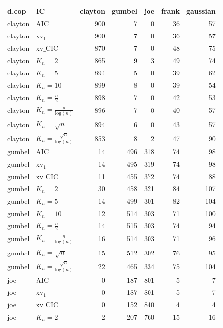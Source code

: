 \begin{table}[htbp]
\centering
\begin{tabular}{llrrrrr}
  \hline
d.cop & IC & clayton & gumbel & joe & frank & gaussian \\ 
  \hline
clayton & AIC & 900 & 7 & 0 & 36 & 57 \\ 
  clayton & $\text{xv}_{1}$ & 900 & 7 & 0 & 36 & 57 \\ 
  clayton & $\text{xv}\_\text{CIC}$ & 870 & 7 & 0 & 48 & 75 \\ 
  clayton & $K_{n}=2$ & 865 & 9 & 3 & 49 & 74 \\ 
  clayton & $K_{n}=5$ & 894 & 5 & 0 & 39 & 62 \\ 
  clayton & $K_{n}=10$ & 899 & 8 & 0 & 39 & 54 \\ 
  clayton & $K_{n}=\tfrac{n}{2}$ & 898 & 7 & 0 & 42 & 53 \\ 
  clayton & $K_{n}=\tfrac{n}{\text{log}(n)}$ & 896 & 7 & 0 & 40 & 57 \\ 
  clayton & $K_{n}=\sqrt{n}$ & 894 & 6 & 0 & 43 & 57 \\ 
  clayton & $K_{n}=\tfrac{\sqrt{n}}{\text{log}(n)}$ & 853 & 8 & 2 & 47 & 90 \\ 
   \hdashline
gumbel & AIC & 14 & 496 & 318 & 74 & 98 \\ 
  gumbel & $\text{xv}_{1}$ & 14 & 495 & 319 & 74 & 98 \\ 
  gumbel & $\text{xv}\_\text{CIC}$ & 11 & 455 & 372 & 74 & 88 \\ 
  gumbel & $K_{n}=2$ & 30 & 458 & 321 & 84 & 107 \\ 
  gumbel & $K_{n}=5$ & 14 & 499 & 301 & 82 & 104 \\ 
  gumbel & $K_{n}=10$ & 12 & 514 & 303 & 71 & 100 \\ 
  gumbel & $K_{n}=\tfrac{n}{2}$ & 14 & 515 & 303 & 74 & 94 \\ 
  gumbel & $K_{n}=\tfrac{n}{\text{log}(n)}$ & 16 & 514 & 303 & 71 & 96 \\ 
  gumbel & $K_{n}=\sqrt{n}$ & 15 & 512 & 302 & 76 & 95 \\ 
  gumbel & $K_{n}=\tfrac{\sqrt{n}}{\text{log}(n)}$ & 22 & 465 & 334 & 75 & 104 \\ 
   \hdashline
joe & AIC & 0 & 187 & 801 & 5 & 7 \\ 
  joe & $\text{xv}_{1}$ & 0 & 187 & 801 & 5 & 7 \\ 
  joe & $\text{xv}\_\text{CIC}$ & 0 & 152 & 840 & 4 & 4 \\ 
  joe & $K_{n}=2$ & 2 & 207 & 760 & 15 & 16 \\ 

\end{tabular}
\end{table}
